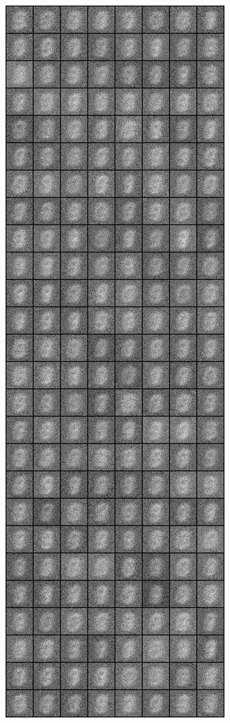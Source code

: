 \begin{figure}
\includegraphics[width=\picwidth\columnwidth]{figures/supplementary/mnist/image_100.png}

\end{figure}
